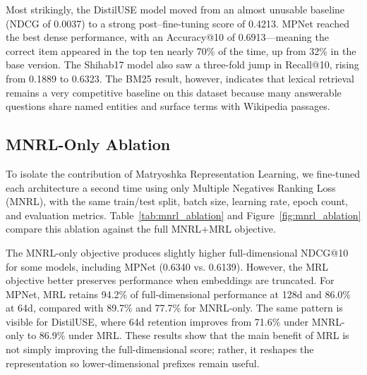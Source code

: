 \documentclass[manuscript,screen,review]{acmart}
\begin{document}
Most strikingly, the DistilUSE model moved from an almost unusable baseline (NDCG of 0.0037) to a strong post--fine-tuning score of 0.4213. MPNet reached the best dense performance, with an Accuracy@10 of 0.6913---meaning the correct item appeared in the top ten nearly 70\% of the time, up from 32\% in the base version. The Shihab17 model also saw a three-fold jump in Recall@10, rising from 0.1889 to 0.6323. The BM25 result, however, indicates that lexical retrieval remains a very competitive baseline on this dataset because many answerable questions share named entities and surface terms with Wikipedia passages.

\subsection{MNRL-Only Ablation}

To isolate the contribution of Matryoshka Representation Learning, we fine-tuned each architecture a second time using only Multiple Negatives Ranking Loss (MNRL), with the same train/test split, batch size, learning rate, epoch count, and evaluation metrics. Table~\ref{tab:mnrl_ablation} and Figure~\ref{fig:mnrl_ablation} compare this ablation against the full MNRL+MRL objective.

The MNRL-only objective produces slightly higher full-dimensional NDCG@10 for some models, including MPNet (0.6340 vs. 0.6139). However, the MRL objective better preserves performance when embeddings are truncated. For MPNet, MRL retains 94.2\% of full-dimensional performance at 128d and 86.0\% at 64d, compared with 89.7\% and 77.7\% for MNRL-only. The same pattern is visible for DistilUSE, where 64d retention improves from 71.6\% under MNRL-only to 86.9\% under MRL. These results show that the main benefit of MRL is not simply improving the full-dimensional score; rather, it reshapes the representation so lower-dimensional prefixes remain useful.
\end{document}
